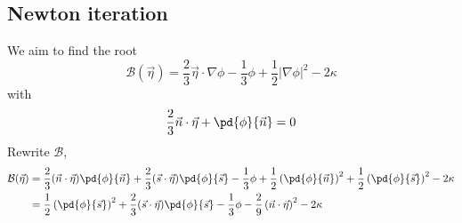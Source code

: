 \documentclass{jfm}
\begin{document}
\subsection{Newton iteration}
We aim to find the root 
\begin{equation}
\mathcal{B}(\vec{\eta})=\frac{2}{3}\vec{\eta}\cdot \nabla \phi  -\frac{1}{3}\phi+\frac{1}{2}|\nabla \phi|^2-2\kappa
\end{equation}
with 
\begin{equation}
\frac{2}{3}\vec{n}\cdot \vec{\eta}+\pd{\phi}{\vec{n}}=0
\end{equation}
Rewrite $\mathcal{B}$,
\begin{align}
\nonumber \mathcal{B}(\vec{\eta})&=\frac{2}{3}(\vec{n}\cdot\vec{\eta}) \pd{\phi}{\vec{n}}+
\frac{2}{3}(\vec{s}\cdot\vec{\eta}) \pd{\phi}{\vec{s}}
  -\frac{1}{3}\phi+\frac{1}{2}\left( \pd{\phi}{\vec{n}}\right)^2
  +\frac{1}{2}\left( \pd{\phi}{\vec{s}}\right)^2-2\kappa\\
  &=\frac{1}{2}\left( \pd{\phi}{\vec{s}}\right)^2+
  \frac{2}{3}(\vec{s}\cdot\vec{\eta}) \pd{\phi}{\vec{s}}
  -\frac{1}{3}\phi-\frac{2}{9}\left( \vec{n}\cdot \vec{\eta}\right)^2
  -2\kappa
\end{align}
\end{document}
